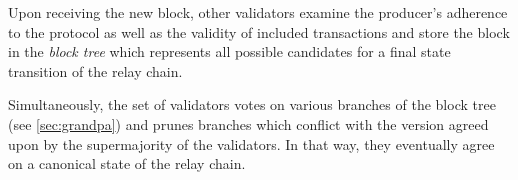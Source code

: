 \documentclass{article}
\begin{document}
Upon receiving the new block, other validators examine the producer's adherence to the protocol as well as the validity of included transactions and store the block in the \emph{block tree} which represents all possible candidates for a final state transition of the relay chain. 

Simultaneously, the set of validators votes on various branches of the block tree (see \ref{sec:grandpa}) and prunes branches which conflict with the version agreed upon by the supermajority of the validators. In that way, they eventually agree on a canonical state of the relay chain.






\end{document}
